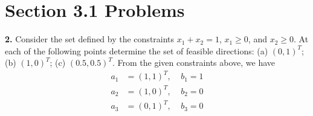 \documentclass{article}
\begin{document}
    \section*{Section 3.1 Problems}
    \textbf{2.} Consider the set defined by the constraints $x_1 + x_2 = 1$, $x_1 \geq 0$, and $x_2 \geq 0$. At each of the following points determine the set of feasible directions: (a) $(0,1)^T$; (b) $(1,0)^T$; (c) $(0.5, 0.5)^T$.
    \newline\newline
    From the given constraints above, we have 
    \begin{align*}
        a_1 &= (1,1)^T, \:\:\:\:\: b_1 = 1\\
        a_2 &= (1,0)^T, \:\:\:\:\: b_2 = 0\\
        a_3 &= (0,1)^T, \:\:\:\:\: b_3 = 0\\
    \end{align*}
\end{document}
